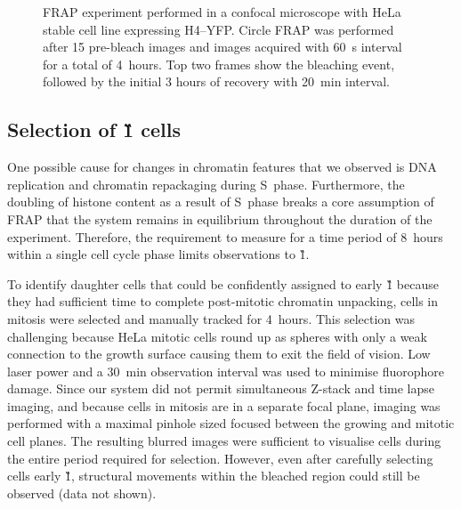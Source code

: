     \begin{figure}
      \centering
        {
          FRAP experiment performed in a confocal microscope with HeLa
          stable cell line expressing H4--YFP.  Circle FRAP was
          performed after 15 pre-bleach images and images acquired
          with \SI{60}{\second} interval for a total of 4~hours.  Top two
          frames show the bleaching event, followed by the initial 3
          hours of recovery with \SI{20}{\minute} interval.
        }
      \label{fig:kill-frap:frap-spot-movement}
    \end{figure}

    \subsection{Selection of \G1{} cells}

    One possible cause for changes in chromatin features that we observed
    is DNA replication and chromatin repackaging during S~phase.
    Furthermore, the doubling of histone content as a result of S~phase breaks
    a core assumption of FRAP that the system remains in equilibrium
    throughout the duration of the experiment.
    Therefore, the requirement to measure for a time period of 8~hours
    within a single cell cycle phase limits observations to \G1{}.

    To identify daughter cells that could be confidently assigned to early \G1{}
    because they had sufficient time to complete
    post-mitotic chromatin unpacking,
    cells in mitosis were selected and manually tracked for 4~hours.
    This selection was challenging because HeLa mitotic cells round up
    as spheres with only a weak connection to the growth surface
    causing them to exit the field of vision.
    Low laser power and a \SI{30}{\minute} observation interval
    was used to minimise fluorophore damage.
    Since our system did not permit simultaneous
    Z-stack and time lapse imaging,
    and because cells in mitosis are in a separate focal plane,
    imaging was performed with a maximal pinhole sized focused
    between the growing and mitotic cell planes.
    The resulting blurred images were sufficient to visualise cells during
    the entire period required for selection.
    However, even after carefully selecting cells early \G1{},
    structural movements within the bleached region could
    still be observed (data not shown).

